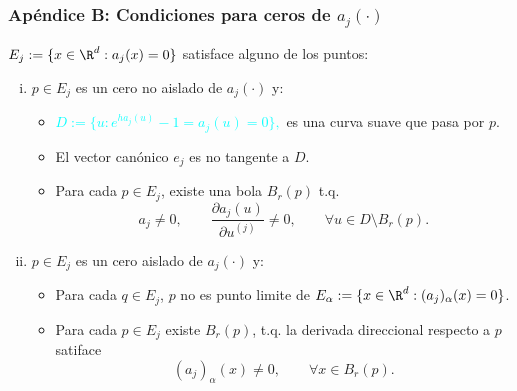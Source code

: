 \begin{frame}[noframenumbering]
	\frametitle{Apéndice B: Condiciones para ceros de $a_j(\cdot)$}    
		\hypertarget{ZerosConditions}{}
		\textcolor{orange}{
			 $E_j:=\{x\in \R^{d}: a_j(x)=0\}$
		} satisface alguno de los puntos:
		\begin{enumerate}[(i)]
			\item
				 $p \in E_j$ es un cero no aislado de  $a_j(\cdot)$ y:
			\begin{itemize}
				\item  
					\textcolor{cyan}{
					$
						D:=\{u: e^{ha_j(u)}-1=a_j(u)= 0\},
					$ 
				}
				es una curva suave que pasa por $p$. 
				\item
				El vector canónico $e_j$ es no tangente a $D$.
				\item
					Para cada $p \in E_j$, existe una bola $B_r(p)$ t.q.
				$$
					a_j\neq 0, \qquad
					\frac{\partial a_j(u)}{\partial u^{(j)}} \neq 0 ,\qquad 
					\forall u \in D
					\setminus B_r(p).
				$$
			\end{itemize}	
			\item
				 $p \in E_j$ es un cero aislado de $a_j(\cdot)$ y:
			\begin{itemize}
				\item
					Para cada $q\in E_j$,  $p$ no es punto limite de
					$E_{\alpha}:=\{x \in \R^d: (a_j)_\alpha(x)=0\}$.
				\item
					Para cada $p \in E_j$ existe  $B_r(p)$, t.q.
					la derivada direccional respecto a $p$ satiface
				$$
				(a_j)_\alpha(x) \neq 0, \qquad \forall x\in B_r(p).
				$$
			\end{itemize}
		\end{enumerate}
\hyperlink{frm:condiciones_zeros}{}
\end{frame}
